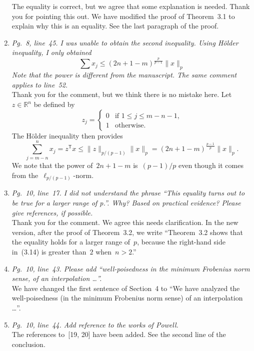 \documentclass{article}
\begin{document}
\begin{enumerate}
    The equality is correct, but we agree that some explanation is needed.
    Thank you for pointing this out.
    We have modified the proof of Theorem~3.1 to explain why this is an equality.
    See the last paragraph of the proof.
    \item \textit{Pg.~8, line~45. I was unable to obtain the second inequality. Using H{\"{o}}lder inequality, I only obtained}
    \begin{equation*}
        \sum x_j \le (2n + 1 - m)^{\frac{p}{p - 1}} \lVert x \rVert_p
    \end{equation*}
    \textit{Note that the power is different from the manuscript. The same comment applies to line~52.}\\
    Thank you for the comment, but we think there is no mistake here.
    Let~$z \in \mathbb{R}^n$ be defined by
    \begin{equation*}
        z_j = \begin{cases}
            0 & \text{if~$1 \le j \le m - n - 1$,} \\
            1 & \text{otherwise.}
        \end{cases}
    \end{equation*}
    The H{\"{o}}lder inequality then provides
    \begin{equation*}
        \sum_{j = m - n}^n x_j = z^{\mathsf{T}} x \le \lVert z \rVert_{p / (p - 1)} \lVert x \rVert_p = (2n + 1 - m)^{\frac{p - 1}{p}} \lVert x \rVert_p.
    \end{equation*}
    We note that the power of~$2n + 1 - m$ is~$(p - 1) / p$ even though it comes from the~$\ell_{p / (p - 1)}$-norm.
    \item \textit{Pg.~10, line~17. I did not understand the phrase ``This equality turns out to be true for a larger range of p.''. Why? Based on practical evidence? Please give references, if possible.}\\
    Thank you for the comment.
    We agree this needs clarification.
    In the new version, after the proof of Theorem~3.2, we write ``Theorem~3.2 shows that the equality holds for a larger range of~$p$, because the right-hand side in~(3.14) is greater than~$2$ when~$n > 2$.''
    \item \textit{Pg.~10, line~43. Please add ``well-poisedness in the minimum Frobenius norm sense, of an interpolation \dots''.}\\
    We have changed the first sentence of Section~4 to ``We have analyzed the well-poisedness (in the minimum Frobenius norm sense) of an interpolation \dots''.
    \item \textit{Pg.~10, line~44. Add reference to the works of Powell.}\\
    The references to~[19, 20] have been added.
    See the second line of the conclusion.
\end{enumerate}
\end{document}

